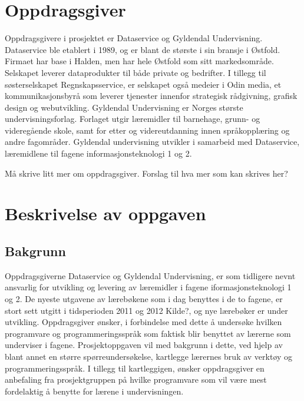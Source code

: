 \section{Oppdragsgiver}

Oppdragsgivere i prosjektet er Dataservice og Gyldendal Undervisning. 
Dataservice ble etablert i 1989, og er blant de største i sin bransje i Østfold. Firmaet har base i Halden, men har hele Østfold som sitt markedsområde. 
Selskapet leverer dataprodukter til både private og bedrifter. I tillegg til søsterselskapet
Regnskapsservice, er selskapet også medeier i Odin media, et kommunikasjonsbyrå som leverer tjenester innenfor strategisk rådgivning, grafisk design og webutvikling.\newline
Gyldendal Undervisning er Norges største undervisningsforlag. Forlaget
utgir læremidler til barnehage, grunn- og videregående skole, samt for etter og
videreutdanning innen språkopplæring og andre fagområder.
Gyldendal undervisning utvikler i samarbeid med Dataservice, læremidlene til fagene informasjonsteknologi 1 og 2.

{\color{red} Må skrive litt mer om oppdragsgiver. Forslag til hva mer som kan skrives her?}


\section{Beskrivelse av oppgaven} 
\label{sec:oppgaven}





\subsection{Bakgrunn}
\label{sec:bakgrunn}
Oppdragsgiverne Dataservice og Gyldendal Undervisning, er som tidligere nevnt ansvarlig for utvikling og levering av læremidler i fagene iformasjonsteknologi 1 og 2. 
De nyeste utgavene av lærebøkene som i dag benyttes i de to fagene, er stort sett utgitt i tidsperioden 2011 og 2012 {\color{red} Kilde?}, og nye lærebøker er under utvikling. 
Oppdragsgiver ønsker, i forbindelse med dette å undersøke hvilken programvare og programmeringsspråk som faktisk blir benyttet av lærerne som underviser i fagene.
Prosjektoppgaven vil med bakgrunn i dette, ved hjelp av blant annet en større spørreundersøkelse, kartlegge lærernes bruk av verktøy og programmeringsspråk. 
I tillegg til kartleggigen, ønsker oppdragsgiver en anbefaling fra prosjektgruppen på hvilke programvare som vil være mest fordelaktig å benytte for lærene i undervisningen. 
  
